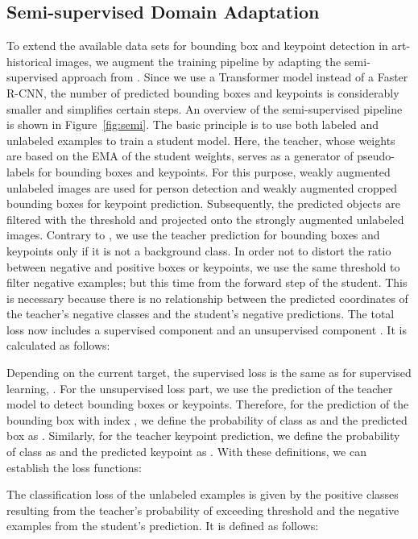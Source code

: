 \documentclass[sigconf]{acmart}
\begin{document}
\subsection{Semi-supervised Domain Adaptation}\label{sec:semi}

To extend the available data sets for bounding box and keypoint detection in art-historical images, we augment the training pipeline by adapting the semi-supervised approach from \citet{DBLP:conf/iccv/Xu00WWWB021}. 
Since we use a Transformer model instead of a Faster R-CNN, the number of predicted bounding boxes and keypoints is considerably smaller and simplifies certain steps. 
An overview of the semi-supervised pipeline is shown in Figure~\ref{fig:semi}. 
The basic principle is to use both labeled and unlabeled examples to train a student model. 
Here, the teacher, whose weights are based on the \ac{EMA} of the student weights, serves as a generator of pseudo-labels for bounding boxes and keypoints. 
For this purpose, weakly augmented unlabeled images are used for person detection and weakly augmented cropped bounding boxes for keypoint prediction. 
Subsequently, the predicted objects are filtered with the threshold  and projected onto the strongly augmented unlabeled images. 
Contrary to \citet{DBLP:conf/iccv/Xu00WWWB021}, we use the teacher prediction for bounding boxes and keypoints only if it is not a background class. 
In order not to distort the ratio between negative and positive boxes or keypoints, we use the same threshold to filter negative examples; but this time from the forward step of the student. 
This is necessary because there is no relationship between the predicted coordinates of the teacher's negative classes and the student's negative predictions. 
The total loss now includes a supervised component  and an unsupervised component . 
It is calculated as follows:

Depending on the current target, the supervised loss is the same as for supervised learning, . For the unsupervised loss part, we use the prediction of the teacher model to detect bounding boxes or keypoints. Therefore, for the prediction of the bounding box with index , we define the probability of class  as  and the predicted box as . Similarly, for the teacher keypoint prediction, we define the probability of class  as  and the predicted keypoint as . With these definitions, we can establish the loss functions:

The classification loss of the unlabeled examples is given by the positive classes resulting from the teacher's probability of exceeding threshold  and the negative examples from the student's prediction. It is defined as follows:
\end{document}
